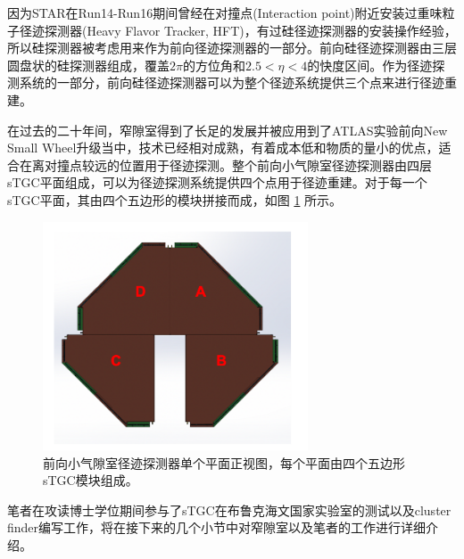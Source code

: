 因为STAR在Run14-Run16期间曾经在对撞点(Interaction point)附近安装过重味粒子径迹探测器(Heavy Flavor Tracker, HFT)，有过硅径迹探测器的安装操作经验，所以硅探测器被考虑用来作为前向径迹探测器的一部分。前向硅径迹探测器由三层圆盘状的硅探测器组成，覆盖$2\pi$的方位角和$2.5 < \eta < 4$的快度区间。作为径迹探测系统的一部分，前向硅径迹探测器可以为整个径迹系统提供三个点来进行径迹重建。

在过去的二十年间，窄隙室得到了长足的发展并被应用到了ATLAS实验前向New Small Wheel升级当中，技术已经相对成熟，有着成本低和物质的量小的优点，适合在离对撞点较远的位置用于径迹探测。整个前向小气隙室径迹探测器由四层sTGC平面组成，可以为径迹探测系统提供四个点用于径迹重建。对于每一个sTGC平面，其由四个五边形的模块拼接而成，如图 \ref{fig:sTGC} 所示。
\begin{figure}[htb]
    \begin{center}
    \includegraphics[width=0.7\textwidth,clip]{figures/Chapter2/sTGC.png}
    \end{center}
    \caption[前向小气隙室径迹探测器单个平面正视图]{前向小气隙室径迹探测器单个平面正视图，每个平面由四个五边形sTGC模块组成。}
    \label{fig:sTGC}
\end{figure}

笔者在攻读博士学位期间参与了sTGC在布鲁克海文国家实验室的测试以及cluster finder编写工作，将在接下来的几个小节中对窄隙室以及笔者的工作进行详细介绍。